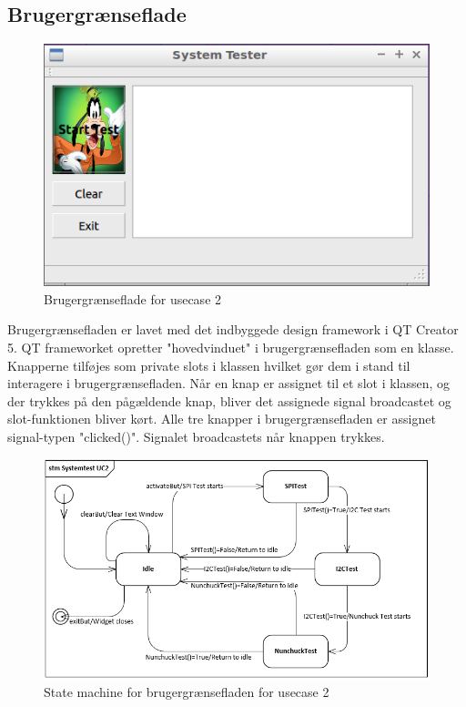 \subsection{Brugergrænseflade}
\begin{figure}[H]
	\centering
	\includegraphics[width=\textwidth]{Afsnit/DesignOgImplementering/images/GUIPic}
	\caption{Brugergrænseflade for usecase 2}
	\label{fig:GUIPic}
\end{figure}

Brugergrænsefladen er lavet med det indbyggede design framework i QT Creator 5.
QT frameworket opretter "hovedvinduet" i brugergrænsefladen som en klasse. Knapperne tilføjes som private slots i klassen
hvilket gør dem i stand til interagere i brugergrænsefladen. Når en knap er assignet til et slot i klassen, og der trykkes på den pågældende knap, bliver det assignede signal broadcastet
og slot-funktionen bliver kørt. Alle tre knapper i brugergrænsefladen er assignet signal-typen "clicked()". Signalet broadcastets når knappen trykkes.

\begin{figure}[H]
	\centering
	\includegraphics[width=1.2\textwidth]{Afsnit/DesignOgImplementering/images/StateMachineUC2}
	\caption{State machine for brugergrænsefladen for usecase 2}
	\label{fig:StateMachineUC2}
\end{figure}

